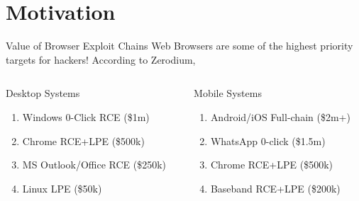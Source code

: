 \section{Motivation}
\frame{\sectionpage}

\begin{frame}{Value of Browser Exploit Chains}
    Web Browsers are some of the highest priority targets for hackers! According to Zerodium, 
    \begin{columns}
        \begin{column}{0.4\textwidth}
            \begin{block}{Desktop Systems}
                \begin{enumerate}
                    \item Windows 0-Click RCE     (\$1m)
                    \item Chrome RCE+LPE          (\$500k)
                    \item MS Outlook/Office RCE (\$250k)
                    \item Linux LPE               (\$50k)
                \end{enumerate}
            \end{block}
        \end{column}
        \begin{column}{0.4\textwidth}
            \begin{block}{Mobile Systems}
                \begin{enumerate}
                    \item Android/iOS Full-chain    (\$2m+)
                    \item WhatsApp 0-click (\$1.5m)
                    \item Chrome RCE+LPE            (\$500k)
                    \item Baseband RCE+LPE          (\$200k)
                \end{enumerate}
            \end{block}
        \end{column}
    \end{columns}
\end{frame}


